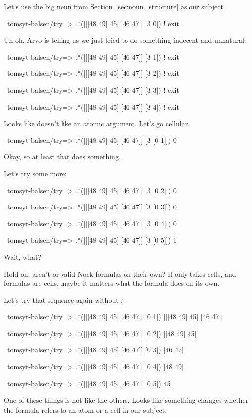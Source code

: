 Let's use the big noun \kode{[[[48 49] 45] [46 47]]} from Section~\ref{sec:noun_structure} as our subject.
\begin{code}
~tomsyt-balsen/try=> .*([[[48 49] 45] [46 47]] [3 0])
! exit
\end{code}
Uh-oh, Arvo is telling us we just tried to do something indecent and unnatural.
\begin{code}
~tomsyt-balsen/try=> .*([[[48 49] 45] [46 47]] [3 1])
! exit

~tomsyt-balsen/try=> .*([[[48 49] 45] [46 47]] [3 2])
! exit

~tomsyt-balsen/try=> .*([[[48 49] 45] [46 47]] [3 3])
! exit

~tomsyt-balsen/try=> .*([[[48 49] 45] [46 47]] [3 4])
! exit
\end{code}
Looks like  doesn't like an atomic argument. Let's go cellular.
\begin{code}
~tomsyt-balsen/try=> .*([[[48 49] 45] [46 47]] [3 [0 1]])
0
\end{code}
Okay, so at least that does something.

Let's try some more:
\begin{code}
~tomsyt-balsen/try=> .*([[[48 49] 45] [46 47]] [3 [0 2]])
0

~tomsyt-balsen/try=> .*([[[48 49] 45] [46 47]] [3 [0 3]])
0

~tomsyt-balsen/try=> .*([[[48 49] 45] [46 47]] [3 [0 4]])
0

~tomsyt-balsen/try=> .*([[[48 49] 45] [46 47]] [3 [0 5]])
1
\end{code}
Wait, what?

Hold on, aren't \kode{[0 1]} or \kode{[0 5]} valid Nock formulas on their own?  If 
only takes cells, and formulas are cells, maybe it matters what the formula
does on its own.

Let's try that sequence again without :
\begin{code}
~tomsyt-balsen/try=> .*([[[48 49] 45] [46 47]] [0 1])
[[[48 49] 45] [46 47]]

~tomsyt-balsen/try=> .*([[[48 49] 45] [46 47]] [0 2])
[[48 49] 45]

~tomsyt-balsen/try=> .*([[[48 49] 45] [46 47]] [0 3])
[46 47]

~tomsyt-balsen/try=> .*([[[48 49] 45] [46 47]] [0 4])
[48 49]

~tomsyt-balsen/try=> .*([[[48 49] 45] [46 47]] [0 5])
45
\end{code}
One of these things is not like the others. Looks like something changes
whether the formula \kode{[0 n]} refers to an atom or a cell in our subject.

